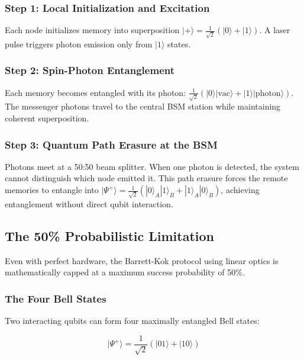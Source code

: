 \subsubsection{Step 1: Local Initialization and Excitation}

Each node initializes memory into superposition $|+\rangle = \frac{1}{\sqrt{2}}(|0\rangle + |1\rangle)$. A laser pulse triggers photon emission only from $|1\rangle$ states.

\subsubsection{Step 2: Spin-Photon Entanglement}

Each memory becomes entangled with its photon: $\frac{1}{\sqrt{2}}(|0\rangle|\text{vac}\rangle + |1\rangle|\text{photon}\rangle)$. The messenger photons travel to the central BSM station while maintaining coherent superposition.

\subsubsection{Step 3: Quantum Path Erasure at the BSM}

Photons meet at a 50:50 beam splitter. When one photon is detected, the system cannot distinguish which node emitted it. This path erasure forces the remote memories to entangle into $|\Psi^+\rangle = \frac{1}{\sqrt{2}}(|0\rangle_A|1\rangle_B + |1\rangle_A|0\rangle_B)$, achieving entanglement without direct qubit interaction.

\subsection{The 50\% Probabilistic Limitation}

Even with perfect hardware, the Barrett-Kok protocol using linear optics is mathematically capped at a maximum success probability of 50\%.

\subsubsection{The Four Bell States}

Two interacting qubits can form four maximally entangled Bell states:

\begin{equation}
|\Psi^+\rangle = \frac{1}{\sqrt{2}}(|01\rangle + |10\rangle)
\end{equation}

